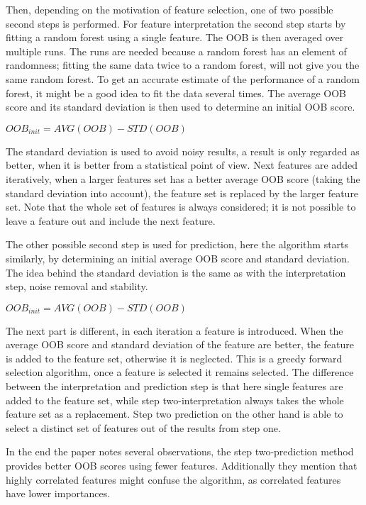 \npar

Then, depending on the motivation of feature selection, one of two possible second steps is performed. For feature interpretation the second step starts by fitting a random forest using a single feature. The OOB is then averaged over multiple runs. The runs are needed because a random forest has an element of randomness; fitting the same data twice to a random forest, will not give you the same random forest. To get an accurate estimate of the performance of a random forest, it might be a good idea to fit the data several times. The average OOB score and its standard deviation is then used to determine an initial OOB score.

\begin{center}
$OOB_{init} = AVG(OOB) - STD(OOB)$
\end{center}

The standard deviation is used to avoid noisy results, a result is only regarded as better, when it is better from a statistical point of view. Next features are added iteratively, when a larger features set has a better average OOB score (taking the standard deviation into account), the feature set is replaced by the larger feature set. Note that the whole set of features is always considered; it is not possible to leave a feature out and include the next feature.

\npar

The other possible second step is used for prediction, here the algorithm starts similarly, by determining an initial average OOB score and standard deviation. The idea behind the standard deviation is the same as with the interpretation step, noise removal and stability.

\begin{center}
$OOB_{init} = AVG(OOB) - STD(OOB)$
\end{center}

The next part is different, in each iteration a feature is introduced. When the average OOB score and standard deviation of the feature are better, the feature is added to the feature set, otherwise it is neglected. This is a greedy forward selection algorithm, once a feature is selected it remains selected. The difference between the interpretation and prediction step is that here single features are added to the feature set, while step two-interpretation always takes the whole feature set as a replacement.  Step two prediction on the other hand is able to select a distinct set of features out of the results from step one.

\npar

In the end the paper notes several observations, the step two-prediction method provides better OOB scores using fewer features. Additionally they mention that highly correlated features might confuse the algorithm, as correlated features have lower importances.